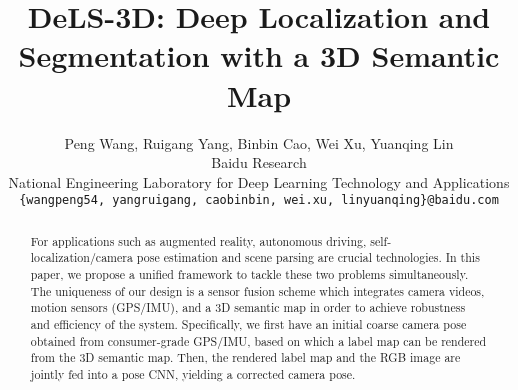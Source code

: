 \documentclass[10pt,twocolumn,letterpaper]{article}
\makeatletter
\DeclareRobustCommand\onedot{\futurelet\@let@token\@onedot}
\def\onedot{\ifx\@let@token.\else.\null\fi\xspace}
\def\etc{\emph{etc}\onedot}
\makeatother
\begin{document}
\title{DeLS-3D: Deep Localization and Segmentation with a 3D Semantic Map}


\author{Peng Wang, Ruigang Yang, Binbin Cao, Wei Xu, Yuanqing Lin\\
Baidu Research \\
National Engineering Laboratory for Deep Learning Technology and Applications\\
{\tt\small \{wangpeng54, yangruigang, caobinbin, wei.xu, linyuanqing\}@baidu.com}}

\maketitle

\begin{abstract}
For applications such as augmented reality, autonomous driving, self-localization/camera pose estimation and scene parsing are crucial technologies. In this paper, we propose a unified framework to tackle these two problems simultaneously. The uniqueness of our design is a sensor fusion scheme which integrates camera videos, motion sensors (GPS/IMU), and a 3D semantic map in order to achieve robustness and efficiency of the system. 
Specifically, we first have an initial coarse camera pose obtained from consumer-grade GPS/IMU, based on which a label map can be rendered from the 3D semantic map. Then, the rendered label map and the RGB image are jointly fed into a pose CNN, yielding a corrected camera pose.

\end{abstract}
\end{document}
